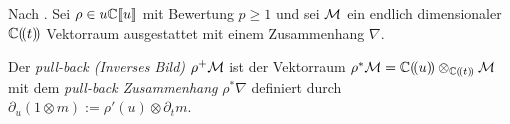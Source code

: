 Nach \cite[1.a]{sabbah_Fourier-local}. Sei $\rho\in u{\mathbb C\llbracket u\rrbracket}$ mit Bewertung
$p\geq1$ und sei $\mathcal{M}$ ein endlich dimensionaler $\mathbb{C}(\!(t)\!)$ Vektorraum
ausgestattet mit einem Zusammenhang $\nabla$.
\begin{defn}
  \cite[1.a]{sabbah_Fourier-local}
  Der \emph{pull-back (Inverses Bild)} $\rho^{+}\mathcal{M}$ ist der Vektorraum
  $\rho^{*}\mathcal{M}=\mathbb{C}(\!(u)\!)\otimes_{\mathbb{C}(\!(t)\!)}\mathcal{M}$ mit dem \emph{pull-back
    Zusammenhang} $\rho^*\nabla$ definiert durch $\partial_u(1\otimes
  m):=\rho'(u)\otimes\partial_tm$.
\end{defn}

\begin{exmp}\label{exmp:Pull-Back}
  \begin{comment}
    Beginne mit
    \[ \tilde P=\tau\partial_\tau^2+2\partial_\tau-1 \]
    und gehe von $\tau$ über zu $t$ via $\tau\rightarrow\frac{1}{t}$:\\
    \begin{itemize}
      \item was passiert mit der Ableitung $\partial_\tau$? Es gilt:
        \[
          \partial_\tau (f(\frac{1}{\tau}))=
          \partial_t(f)\cdot (-\frac{1}{\tau^2})=
          -\partial_t(f)\cdot t^2= %
          - t^2 \cdot \partial_t(f)
        \]
        also:
        \[
          \partial_\tau=-t^2\partial_t
        \]
      \item was ist $\partial_t(t^2\partial_t)$?
        \begin{align*}
          \partial_tt^2\partial_t &= (\partial_tt)t\partial_t\\
          &= (t\partial_t-1)t\partial_t\\
          &= t(\partial_tt)\partial_t-t\partial_t\\
          &= t(t\partial_t-1)\partial_t-t\partial_t\\
          &= t^2\partial_t^2-2t\partial_t\\
        \end{align*}
      \item was passiert mit $ \tilde P=\tau\partial_\tau^2+2\partial_\tau-1 $?
        \begin{align*}
          \tilde P &= \tau\partial_\tau^2+2\partial_\tau-1\\
          &\overset{\tau\rightarrow\frac{1}{t}}{\longrightarrow}
            \frac{1}{t}(-t^2\partial_t)^2+2(-t^2\partial_t)-1\\
          &= \frac{1}{t}t^2(\partial_t(t^2\partial_t))-2t^2\partial_t-1\\
          &= t(\partial_t(t^2\partial_t))-2t^2\partial_t-1\\
          &= t(t^2\partial_t^2-2t\partial_t)-2t^2\partial_t-1\\
          &= t^3\partial_t^2-4t^2\partial_t-1 =: P\\
        \end{align*}
    \end{itemize}
  \end{comment}


\end{exmp}
